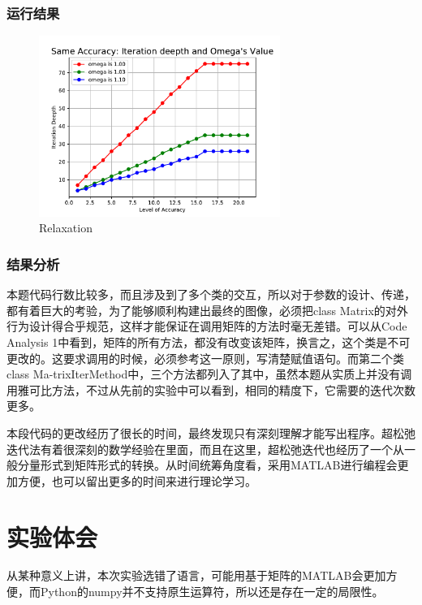 \subsubsection{运行结果}

\begin{figure}[H]   %
    \centering
    \includegraphics[width=0.7\textwidth]{../../img/04/relax.pdf}
    \caption{Relaxation}
    \label{Fig:relax}
\end{figure}

\subsubsection{结果分析}
本题代码行数比较多，而且涉及到了多个类的交互，所以对于参数的设计、传递，都有着巨大的考验，为了能够顺利构建出最终的图像，必须把class Matrix的对外行为设计得合乎规范，这样才能保证在调用矩阵的方法时毫无差错。可以从Code Analysis 1中看到，矩阵的所有方法，都没有改变该矩阵，换言之，这个类是不可更改的。这要求调用的时候，必须参考这一原则，写清楚赋值语句。而第二个类class Ma-trixIterMethod中，三个方法都列入了其中，虽然本题从实质上并没有调用雅可比方法，不过从先前的实验中可以看到，相同的精度下，它需要的迭代次数更多。

本段代码的更改经历了很长的时间，最终发现只有深刻理解才能写出程序。超松弛迭代法有着很深刻的数学经验在里面，而且在这里，超松弛迭代也经历了一个从一般分量形式到矩阵形式的转换。从时间统筹角度看，采用MATLAB进行编程会更加方便，也可以留出更多的时间来进行理论学习。


\section{实验体会}

从某种意义上讲，本次实验选错了语言，可能用基于矩阵的MATLAB会更加方便，而Python的numpy并不支持原生运算符，所以还是存在一定的局限性。

